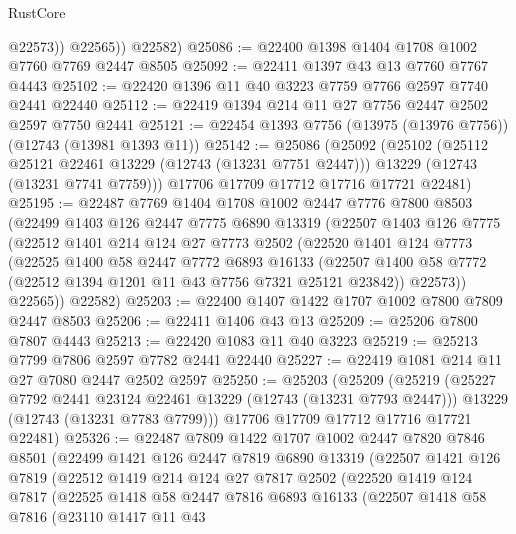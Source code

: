 \begin{lexlean}{RustCore}
\begin{coremodule}
              @22573))
          @22565))
      @22582)
@25086 := @22400 @1398 @1404 @1708 @1002 @7760 @7769 @2447 @8505
@25092 := @22411 @1397 @43 @13 @7760 @7767 @4443
@25102 := @22420 @1396 @11 @40 @3223 @7759 @7766 @2597 @7740 @2441 @22440
@25112 := @22419 @1394 @214 @11 @27 @7756 @2447 @2502 @2597 @7750 @2441
@25121 := @22454 @1393 @7756 (@13975 (@13976 @7756)) (@12743 (@13981 @1393 @11))
@25142 := @25086
    (@25092
      (@25102
        (@25112 @25121 @22461 @13229 (@12743 (@13231 @7751 @2447)))
        @13229
        (@12743 (@13231 @7741 @7759)))
      @17706
      @17709
      @17712
      @17716
      @17721
      @22481)
@25195 := @22487
    @7769
    @1404
    @1708
    @1002
    @2447
    @7776
    @7800
    @8503
    (@22499
      @1403
      @126
      @2447
      @7775
      @6890
      @13319
      (@22507
        @1403
        @126
        @7775
        (@22512
          @1401
          @214
          @124
          @27
          @7773
          @2502
          (@22520
            @1401
            @124
            @7773
            (@22525
              @1400
              @58
              @2447
              @7772
              @6893
              @16133
              (@22507 @1400 @58 @7772 (@22512 @1394 @1201 @11 @43 @7756 @7321 @25121 @23842))
              @22573))
          @22565))
      @22582)
@25203 := @22400 @1407 @1422 @1707 @1002 @7800 @7809 @2447 @8503
@25206 := @22411 @1406 @43 @13
@25209 := @25206 @7800 @7807 @4443
@25213 := @22420 @1083 @11 @40 @3223
@25219 := @25213 @7799 @7806 @2597 @7782 @2441 @22440
@25227 := @22419 @1081 @214 @11 @27 @7080 @2447 @2502 @2597
@25250 := @25203
    (@25209
      (@25219
        (@25227 @7792 @2441 @23124 @22461 @13229 (@12743 (@13231 @7793 @2447)))
        @13229
        (@12743 (@13231 @7783 @7799)))
      @17706
      @17709
      @17712
      @17716
      @17721
      @22481)
@25326 := @22487
    @7809
    @1422
    @1707
    @1002
    @2447
    @7820
    @7846
    @8501
    (@22499
      @1421
      @126
      @2447
      @7819
      @6890
      @13319
      (@22507
        @1421
        @126
        @7819
        (@22512
          @1419
          @214
          @124
          @27
          @7817
          @2502
          (@22520
            @1419
            @124
            @7817
            (@22525
              @1418
              @58
              @2447
              @7816
              @6893
              @16133
              (@22507
                @1418
                @58
                @7816
                (@23110
                  @1417
                  @11
                  @43

\end{coremodule}
\end{lexlean}
